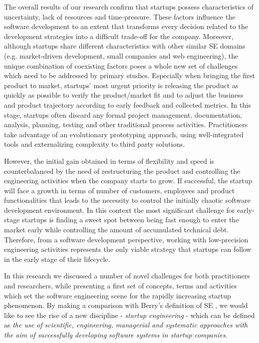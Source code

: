 \documentclass[10pt,journal,letterpaper,compsoc]{IEEEtran}
\begin{document}
The overall results of our research confirm that startups possess %
characteristics of uncertainty, lack of resources and time-pressure. These 
factors influence the software development to an extent that transforms every 
decision related to the development strategies into a difficult trade-off for 
the company. Moreover, although startups share different characteristics with 
other similar SE domains (e.g. market-driven development, small companies and 
web engineering), the unique combination of coexisting factors poses a whole new 
set of challenges which need to be addressed by primary studies. Especially when 
bringing the first product to market, startups' most urgent priority is 
releasing the product as quickly as possible to verify the product/market fit 
and to adjust the business and product trajectory according to early feedback 
and collected metrics. In this stage, startups often discard any formal project 
management, documentation, analysis, planning, testing and other traditional 
process activities. Practitioners take advantage of an evolutionary prototyping 
approach, using well-integrated tools and externalizing complexity to third 
party solutions.

However, the initial gain obtained in terms of flexibility and speed is 
counterbalanced by the need of restructuring the product and controlling the 
engineering activities when the company starts to grow. If successful, the 
startup will face a growth in terms of number of customers, employees and 
product functionalities that leads to the necessity to control the initially 
chaotic software development environment. In this context the most significant 
challenge for early-stage startups is finding a sweet spot between being fast 
enough to enter the market early while controlling the amount of accumulated 
technical debt.  %
Therefore, from a software development perspective, working with low-precision 
engineering activities represents the only viable strategy that startups can 
follow in the early stage of their lifecycle.

In this research we discussed a number of novel challenges for both 
practitioners and researchers, while presenting a first set of concepts, terms 
and activities which set the software engineering scene for the rapidly 
increasing startup phenomenon. By making a comparison with Berry's definition of 
SE \cite{Berry1992}, we would like to see the rise of a new discipline - 
\textit{startup engineering} - which can be defined as  \textit{the use of 
scientific, engineering, managerial and systematic approaches with the aim of 
successfully developing software systems in startup companies}. %
\end{document}
